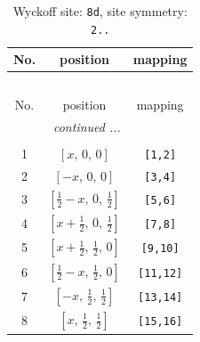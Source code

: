 \documentclass[fleqn,8pt]{jsarticle}
\begin{document}
\begin{longtable}{ccc}
\caption{Wyckoff site: {\tt 8d}, site symmetry: {\tt 2..}}
 \\
 \hline \hline
No. & position & mapping \\ \hline \endfirsthead

\multicolumn{2}{l}{\tablename\ \thetable{}} \\
 \hline \hline
No. & position & mapping \\ \hline \endhead

 \hline \hline
\multicolumn{2}{r}{\footnotesize\it continued ...} \\ \endfoot

 \hline \hline
\multicolumn{2}{r}{} \\ \endlastfoot

1 & $\left[ x,\, 0,\, 0 \right]$ & {\tt [1,2]} \\ \hline
2 & $\left[ - x,\, 0,\, 0 \right]$ & {\tt [3,4]} \\ \hline
3 & $\left[ \frac{1}{2} - x,\, 0,\, \frac{1}{2} \right]$ & {\tt [5,6]} \\ \hline
4 & $\left[ x + \frac{1}{2},\, 0,\, \frac{1}{2} \right]$ & {\tt [7,8]} \\ \hline
5 & $\left[ x + \frac{1}{2},\, \frac{1}{2},\, 0 \right]$ & {\tt [9,10]} \\ \hline
6 & $\left[ \frac{1}{2} - x,\, \frac{1}{2},\, 0 \right]$ & {\tt [11,12]} \\ \hline
7 & $\left[ - x,\, \frac{1}{2},\, \frac{1}{2} \right]$ & {\tt [13,14]} \\ \hline
8 & $\left[ x,\, \frac{1}{2},\, \frac{1}{2} \right]$ & {\tt [15,16]} \\
\end{longtable}
\renewcommand{\arraystretch}{1.2}
\end{document}
